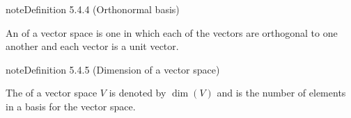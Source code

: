 \documentclass[letterpaper,10pt,english]{jupyterBook}
\begin{document}
\ignorespaces \label{_pages/5.4_Basis:orthonormal-basis-definition}
\begin{sphinxadmonition}{note}{Definition 5.4.4 (Orthonormal basis)}



\sphinxAtStartPar
An  of a vector space is one in which each of the vectors are orthogonal to one another and each vector is a unit vector.
\end{sphinxadmonition}

\ignorespaces \label{_pages/5.4_Basis:vector-space-dimension-definition}
\begin{sphinxadmonition}{note}{Definition 5.4.5 (Dimension of a vector space)}



\sphinxAtStartPar
The  of a vector space \(V\) is denoted by \(\dim(V)\) and is the number of elements in a basis for the vector space.
\end{sphinxadmonition}
\end{document}
